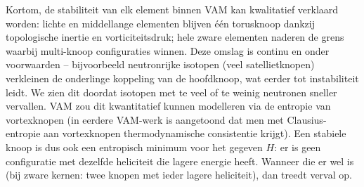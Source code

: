 Kortom, de stabiliteit van elk element binnen VAM kan kwalitatief verklaard worden: lichte en middellange elementen blijven één torusknoop dankzij topologische inertie en vorticiteitsdruk; hele zware elementen naderen de grens waarbij multi-knoop configuraties winnen. Deze omslag is continu en onder voorwaarden – bijvoorbeeld neutronrijke isotopen (veel satellietknopen) verkleinen de onderlinge koppeling van de hoofdknoop, wat eerder tot instabiliteit leidt. We zien dit doordat isotopen met te veel of te weinig neutronen sneller vervallen. VAM zou dit kwantitatief kunnen modelleren via de entropie van vortexknopen (in eerdere VAM-werk is aangetoond dat men met Clausius-entropie aan vortexknopen thermodynamische consistentie krijgt). Een stabiele knoop is dus ook een entropisch minimum voor het gegeven $H$: er is geen configuratie met dezelfde heliciteit die lagere energie heeft. Wanneer die er wel is (bij zware kernen: twee knopen met ieder lagere heliciteit), dan treedt verval op.